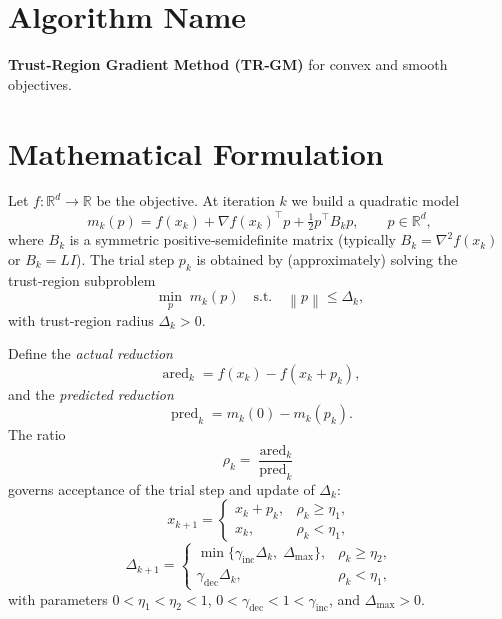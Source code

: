 \documentclass{article}
\newcommand{\norm}[1]{\left\lVert#1\right\rVert}
\begin{document}
\section*{Algorithm Name}
\textbf{Trust‑Region Gradient Method (TR‑GM)} for convex and smooth objectives.

\section*{Mathematical Formulation}
Let $f:\mathbb{R}^{d}\rightarrow\mathbb{R}$ be the objective.  
At iteration $k$ we build a quadratic model
\[
m_k(p)=f(x_k)+\nabla f(x_k)^{\top}p+\tfrac12 p^{\top}B_k p,
\qquad p\in\mathbb{R}^{d},
\]
where $B_k$ is a symmetric positive‑semidefinite matrix (typically $B_k=\nabla^{2}f(x_k)$ or $B_k=L I$).  
The trial step $p_k$ is obtained by (approximately) solving the trust‑region subproblem
\[
\min_{p}\; m_k(p)\quad\text{s.t.}\quad \norm{p}\le \Delta_k,
\tag{TR}
\]
with trust‑region radius $\Delta_k>0$.

Define the \emph{actual reduction}
\[
\operatorname{ared}_k = f(x_k)-f(x_k+p_k),
\]
and the \emph{predicted reduction}
\[
\operatorname{pred}_k = m_k(0)-m_k(p_k).
\]
The ratio
\[
\rho_k = \frac{\operatorname{ared}_k}{\operatorname{pred}_k}
\tag{1}
\]
governs acceptance of the trial step and update of $\Delta_k$:
\[
x_{k+1}= 
\begin{cases}
x_k+p_k, & \rho_k\ge \eta_1,\\[4pt]
x_k,    & \rho_k<\eta_1,
\end{cases}
\tag{2}
\]
\[
\Delta_{k+1}= 
\begin{cases}
\min\{\gamma_{\text{inc}}\Delta_k,\;\Delta_{\max}\}, & \rho_k\ge \eta_2,\\[4pt]
\gamma_{\text{dec}}\Delta_k, & \rho_k<\eta_1,
\end{cases}
\tag{3}
\]
with parameters $0<\eta_1<\eta_2<1$, $0<\gamma_{\text{dec}}<1<\gamma_{\text{inc}}$, and $\Delta_{\max}>0$.
\end{document}
